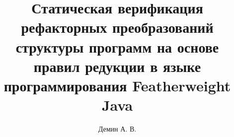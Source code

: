 \documentclass{itmo-student-thesis}
\begin{document}
\title{Статическая верификация рефакторных преобразований структуры программ на основе правил редукции в языке программирования Featherweight Java}
\author{Демин А. В.}

\makemastertitle

\tableofcontents







\printbibliography[heading=trueHeading]
\end{document}
